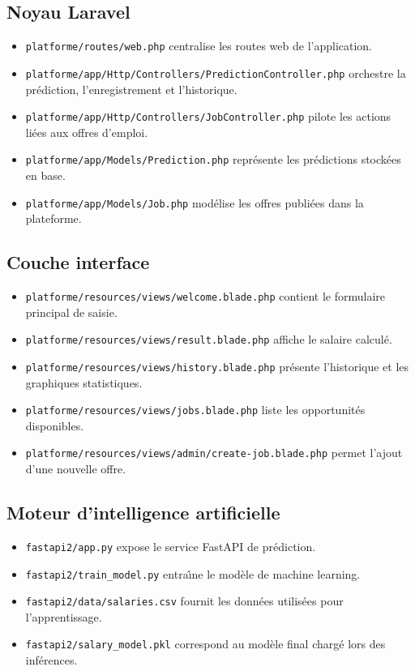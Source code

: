 \documentclass[11pt,a4paper]{article}
\begin{document}
\subsection{Noyau Laravel}
\begin{itemize}[leftmargin=1.2cm]
    \item \texttt{platforme/routes/web.php} centralise les routes web de l'application.
    \item \texttt{platforme/app/Http/Controllers/PredictionController.php} orchestre la pr\'ediction, l'enregistrement et l'historique.
    \item \texttt{platforme/app/Http/Controllers/JobController.php} pilote les actions li\'ees aux offres d'emploi.
    \item \texttt{platforme/app/Models/Prediction.php} repr\'esente les pr\'edictions stock\'ees en base.
    \item \texttt{platforme/app/Models/Job.php} mod\'elise les offres publi\'ees dans la plateforme.
\end{itemize}

\subsection{Couche interface}
\begin{itemize}[leftmargin=1.2cm]
    \item \texttt{platforme/resources/views/welcome.blade.php} contient le formulaire principal de saisie.
    \item \texttt{platforme/resources/views/result.blade.php} affiche le salaire calcul\'e.
    \item \texttt{platforme/resources/views/history.blade.php} pr\'esente l'historique et les graphiques statistiques.
    \item \texttt{platforme/resources/views/jobs.blade.php} liste les opportunit\'es disponibles.
    \item \texttt{platforme/resources/views/admin/create-job.blade.php} permet l'ajout d'une nouvelle offre.
\end{itemize}

\subsection{Moteur d'intelligence artificielle}
\begin{itemize}[leftmargin=1.2cm]
    \item \texttt{fastapi2/app.py} expose le service FastAPI de pr\'ediction.
    \item \texttt{fastapi2/train\_model.py} entra\^\i ne le mod\`ele de machine learning.
    \item \texttt{fastapi2/data/salaries.csv} fournit les donn\'ees utilis\'ees pour l'apprentissage.
    \item \texttt{fastapi2/salary\_model.pkl} correspond au mod\`ele final charg\'e lors des inf\'erences.
\end{itemize}
\end{document}
